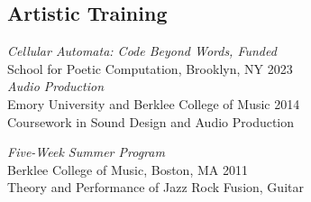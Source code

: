 \subsection{Artistic Training}
{\sl Cellular Automata: Code Beyond Words, Funded}\\
School for Poetic Computation, Brooklyn, NY\hfill
2023 \\

{\sl Audio Production}\\
Emory University and Berklee College of Music \hfill
2014 \\
Coursework in Sound Design and Audio Production


{\sl Five-Week Summer Program}\\
Berklee College of Music, Boston, MA \hfill
2011 \\
Theory and Performance of Jazz Rock Fusion, Guitar

